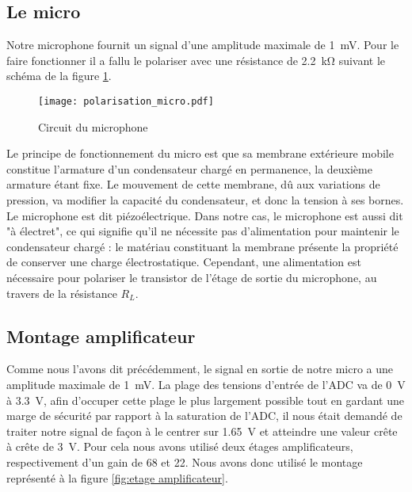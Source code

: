 \subsection{Le micro}
Notre microphone fournit un signal d'une amplitude maximale de \SI{1}{\milli\volt}. Pour le faire fonctionner il a fallu le polariser avec une résistance de \SI{2.2}{\kilo\ohm} suivant le schéma de la figure \ref{fig:polarisation du micro}.

\begin{figure}[htbp]
\centering
\texttt{[image: polarisation\_micro.pdf]}
\caption{Circuit du microphone}
\label{fig:polarisation du micro}
\end{figure}
Le principe de fonctionnement du micro est que sa membrane extérieure mobile constitue l'armature d'un condensateur chargé en permanence, la deuxième armature étant fixe. Le mouvement de cette membrane, dû aux variations de pression, va modifier la capacité du condensateur, et donc la tension à ses bornes. Le microphone est dit piézoélectrique. Dans notre cas, le microphone est aussi dit "à électret", ce qui signifie qu'il ne nécessite pas d'alimentation pour maintenir le condensateur chargé : le matériau constituant la membrane présente la propriété de conserver une charge électrostatique. Cependant, une alimentation est nécessaire pour polariser le transistor de l'étage de sortie du microphone, au travers de la résistance $R_L$. 

\subsection{Montage amplificateur}
Comme nous l'avons dit précédemment, le signal en sortie de notre micro a une amplitude maximale de \SI{1}{\milli\volt}. La plage des tensions d'entrée de l'ADC va de \SI{0}{\volt} à \SI{3.3}{\volt}, afin d'occuper cette plage le plus largement possible tout en gardant une marge de sécurité par rapport à la saturation de l'ADC, il nous était demandé de traiter notre signal de façon à le centrer sur \SI{1.65}{\volt} et atteindre une valeur crête à crête de \SI{3}{\volt}. Pour cela nous avons utilisé deux étages amplificateurs, respectivement d'un gain de 68 et 22. Nous avons donc utilisé le montage représenté à la figure \ref{fig:etage amplificateur}. 

